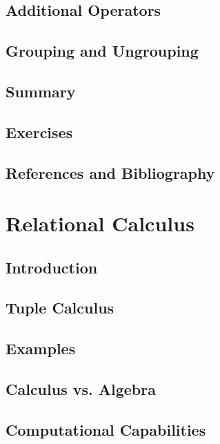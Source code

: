 \documentclass{book}
\begin{document}
\section{Additional Operators}

\section{Grouping and Ungrouping}

\section{Summary}

\section{Exercises}

\section{References and Bibliography}










\chapter{Relational Calculus}

\section{Introduction}

\section{Tuple Calculus}

\section{Examples}

\section{Calculus vs. Algebra}

\section{Computational Capabilities}
\end{document}
